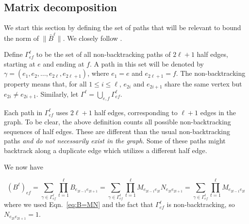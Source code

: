 \subsection{Matrix decomposition}\label{sec:matrix_decomp}

We start this section by defining the set of paths that will be relevant to 
bound the norm of $\|\bar{B}^{\ell}\|$.
We closely follow \cite{bordenave2015}.
\begin{definition}
Define $\Gamma^{\ell}_{ef}$ to be the set of all 
non-backtracking paths of $2\ell+1$ half edges, 
starting at $e$ and ending at $f$. 
A path in this set will be denoted by
$\gamma= (e_1,e_2,\dots,e_{2\ell},e_{2\ell+1})$,
where $e_1 = e$ and $e_{2\ell + 1} = f$. 
The non-backtracking property means that,
for all $1\leq i\leq \ell$, $e_{2i}$ and $e_{2i+1}$ share the same vertex 
but $e_{2i}\neq e_{2i+1}$.
Similarly, let $\Gamma^\ell = \bigcup_{e,f} \Gamma^\ell_{ef}$.
\end{definition}

Each path in $\Gamma^\ell_{ef}$ uses $2 \ell + 1$ half edges,
corresponding to $\ell + 1$ edges in the graph.
To be clear, the above definition counts all possible
non-backtracking sequences of half edges.
These are different than the usual non-backtracking paths 
{\em and do not necessarily exist in the graph}.
Some of these paths might backtrack along a duplicate
edge which utilizes a different half edge.


We now have

\begin{equation}
\label{eq:B_in_terms_of_M}
(B^{\ell})_{ef} = 
\sum_{\gamma \in \Gamma^\ell_{ef}}
\prod_{t=1}^{\ell} B_{e_{2t-1} e_{2t+1}}
= 
\sum_{\gamma \in \Gamma^\ell_{ef}}
\prod_{t=1}^{\ell} M_{e_{2t-1} e_{2t}}N_{e_{2t}e_{2t+1}}
=
\sum_{\gamma \in \Gamma^\ell_{ef}}
\prod_{t=1}^{\ell} M_{e_{2t-1} e_{2t}}
\end{equation}
where we used Eqn.~\ref{eq:B=MN}
and the fact that $\Gamma^{\ell}_{ef}$ is non-backtracking, 
so
$
N_{e_{2t}e_{2t+1}}=1
$.

